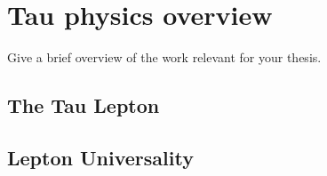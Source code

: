 \chapter{Tau physics overview}\label{chap:relatedwork}
Give a brief overview of the work relevant for your thesis. 

\section{The Tau Lepton}

\section{Lepton Universality}

